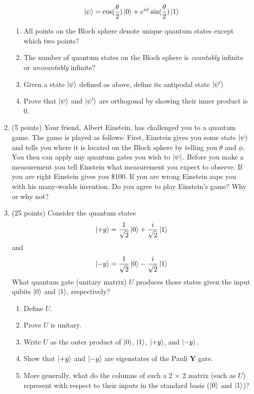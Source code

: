 \documentclass[12pt]{article}
\begin{document}
\begin{enumerate}[font=\bfseries]
    \[\ket{\psi} = \cos(\frac{\theta}{2})\ket{0}
    + e^{i\phi}\sin(\frac{\theta}{2})\ket{1}\]
    \begin{enumerate}
        \item All points on the Bloch sphere denote unique quantum states except which two points?
        \item The number of quantum states on the Bloch sphere is \emph{countably} infinite or \emph{uncountably} infinite?
        \item Given a state $\ket{\psi}$ defined as above, define its antipodal state $\ket{\psi'}$
        \item Prove that $\ket{\psi}$ and $\ket{\psi'}$ are orthogonal by showing their inner product is 0.
    \end{enumerate}
    \item (5 points) Your friend, Albert Einstein, has challenged you to a quantum game. The game is played as follows: First, Einstein gives you some state $\ket{\psi}$ and tells you where it is located on the Bloch sphere by telling you $\theta$ and $\phi$. You then can apply any quantum gates you wish to $\ket{\psi}$. Before you make a measurement you tell Einstein what measurement you expect to observe. If you are right Einstein gives you \$100. If you are wrong Einstein zaps you with his many-worlds invention. Do you agree to play Einstein's game? Why or why not?
    \item (25 points) Consider the quantum states
        \[\ket{+y} = \frac{1}{\sqrt{2}}\ket{0} + \frac{i}{\sqrt{2}}\ket{1}\]
        and
        \[\ket{-y} = \frac{1}{\sqrt{2}}\ket{0} - \frac{i}{\sqrt{2}}\ket{1}\]
        What quantum gate (unitary matrix) $U$ produces those states given the input qubits $\ket{0}$ and $\ket{1}$, respectively?
        \begin{enumerate}
            \item Define $U$.
            \item Prove $U$ is unitary.
            \item Write $U$ as the outer product of $\ket{0}$, $\ket{1}$, $\ket{+y}$, and $\ket{-y}$.
            \item Show that $\ket{+y}$ and $\ket{-y}$ are eigenstates of the Pauli $\mathbf{Y}$ gate.
            \item More generally, what do the columns of such a 2 × 2 matrix (such as $U$) represent with respect to their inputs in the standard basis ($\ket{0}$ and $\ket{1}$)?
        \end{enumerate}
\end{enumerate}
\end{document}
